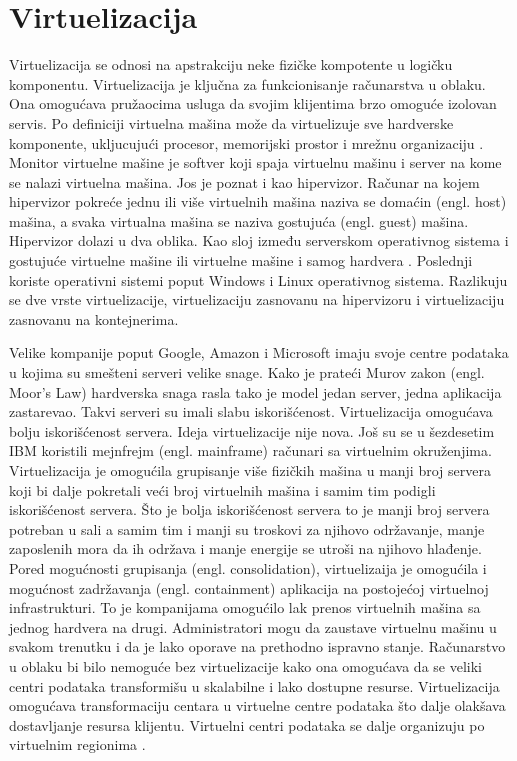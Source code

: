 \documentclass[12pt,oneside]{memoir}
\begin{document}


\section{Virtuelizacija}
Virtuelizacija se odnosi na apstrakciju neke fizičke kompotente u logičku komponentu. Virtuelizacija je ključna za funkcionisanje računarstva u oblaku. Ona omogućava pružaocima usluga da svojim klijentima brzo omoguće izolovan servis. Po definiciji virtuelna mašina može da virtuelizuje sve hardverske komponente, ukljucujući procesor, memorijski prostor i mrežnu organizaciju \cite{ve}. Monitor virtuelne mašine je softver koji spaja virtuelnu mašinu i server na kome se nalazi virtuelna mašina. Jos je poznat i kao hipervizor. Računar na kojem hipervizor pokreće jednu ili više virtuelnih mašina naziva se domaćin (engl. host) mašina, a svaka virtualna mašina se naziva gostujuća (engl. guest) mašina. Hipervizor dolazi u dva oblika. Kao sloj između serverskom operativnog sistema i gostujuće virtuelne mašine ili virtuelne mašine i samog hardvera \cite{ve}. Poslednji koriste operativni sistemi poput Windows i Linux operativnog sistema. Razlikuju se dve vrste virtuelizacije, virtuelizaciju zasnovanu na hipervizoru i virtuelizaciju zasnovanu na kontejnerima.
 
Velike kompanije poput Google, Amazon i Microsoft imaju svoje centre podataka u kojima su smešteni serveri velike snage. Kako je prateći Murov zakon (engl. Moor's Law) hardverska snaga rasla tako je model jedan server, jedna aplikacija zastarevao. Takvi serveri su imali slabu iskorišćenost. Virtuelizacija omogućava bolju iskorišćenost servera. Ideja virtuelizacije nije nova. Još su se u šezdesetim IBM koristili mejnfrejm (engl. mainframe) računari sa virtuelnim okruženjima. Virtuelizacija je omogućila grupisanje više fizičkih mašina u manji broj servera koji bi dalje pokretali veći broj virtuelnih mašina i samim tim podigli iskorišćenost servera. Što je bolja iskorišćenost servera to je manji broj servera potreban u sali a samim tim i manji su troskovi za njihovo održavanje, manje zaposlenih mora da ih održava i manje energije se utroši na njihovo hlađenje. Pored mogućnosti grupisanja (engl. consolidation), virtuelizaija je omogućila i mogućnost zadržavanja (engl. containment) aplikacija na postojećoj virtuelnoj infrastrukturi. To je kompanijama omogućilo lak prenos virtuelnih mašina sa jednog hardvera na drugi. Administratori mogu da zaustave virtuelnu mašinu u svakom trenutku i da je lako oporave na prethodno ispravno stanje. Računarstvo u oblaku bi bilo nemoguće bez virtuelizacije kako ona omogućava da se veliki centri podataka transformišu u skalabilne i lako dostupne resurse. Virtuelizacija omogućava transformaciju centara u virtuelne centre podataka što dalje olakšava dostavljanje resursa klijentu. Virtuelni centri podataka se dalje organizuju po virtuelnim regionima \cite{ve}.
\end{document}
